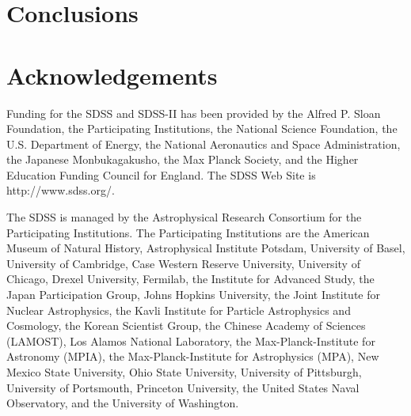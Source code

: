 \documentclass[fleqn,usenatbib]{mnras}  %
\begin{document}
\section{Conclusions}
\label{sec:conclusions}



\section*{Acknowledgements}

Funding for the SDSS and SDSS-II has been provided by the Alfred P. Sloan Foundation, the Participating Institutions, the National Science Foundation, the U.S. Department of Energy, the National Aeronautics and Space Administration, the Japanese Monbukagakusho, the Max Planck Society, and the Higher Education Funding Council for England. The SDSS Web Site is http://www.sdss.org/.

The SDSS is managed by the Astrophysical Research Consortium for the Participating Institutions. The Participating Institutions are the American Museum of Natural History, Astrophysical Institute Potsdam, University of Basel, University of Cambridge, Case Western Reserve University, University of Chicago, Drexel University, Fermilab, the Institute for Advanced Study, the Japan Participation Group, Johns Hopkins University, the Joint Institute for Nuclear Astrophysics, the Kavli Institute for Particle Astrophysics and Cosmology, the Korean Scientist Group, the Chinese Academy of Sciences (LAMOST), Los Alamos National Laboratory, the Max-Planck-Institute for Astronomy (MPIA), the Max-Planck-Institute for Astrophysics (MPA), New Mexico State University, Ohio State University, University of Pittsburgh, University of Portsmouth, Princeton University, the United States Naval Observatory, and the University of Washington. 





%



\bsp	%
\label{lastpage}
\end{document}
